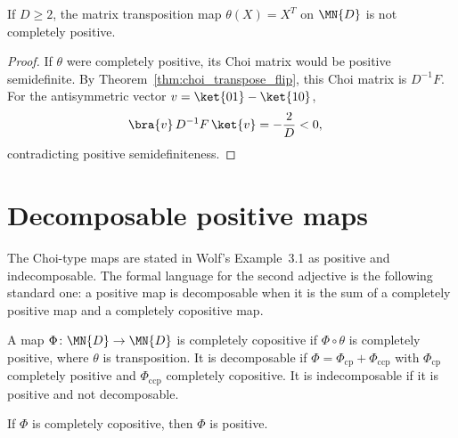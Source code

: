 \begin{theorem}
    \label{thm:transpose_not_completely_positive}
    \leanok
    If $D \ge 2$, the matrix transposition map $\theta(X)=X^T$ on $\MN{D}$
    is not completely positive.
\end{theorem}

\begin{proof}\leanok
    If $\theta$ were completely positive, its Choi matrix would be positive
    semidefinite. By Theorem~\ref{thm:choi_transpose_flip}, this Choi matrix is
    $D^{-1}F$. For the antisymmetric vector
    $v=\ket{01}-\ket{10}$,
    \begin{align}
        \bra{v}\,D^{-1}F\,\ket{v}
         & =-\frac{2}{D}<0,
        \notag
    \end{align}
    contradicting positive semidefiniteness.
\end{proof}

\section{Decomposable positive maps}

The Choi-type maps are stated in Wolf's Example~3.1 as positive and
indecomposable. The formal language for the second adjective is the following
standard one: a positive map is decomposable when it is the sum of a completely
positive map and a completely copositive map.

\begin{definition}
    \label{def:decomposable_positive_map}
    \leanok
    A map $\Phi\colon\MN{D}\to\MN{D}$ is completely copositive if
    $\Phi\circ\theta$ is completely positive, where $\theta$ is transposition.
    It is decomposable if
    $\Phi=\Phi_{\mathrm{cp}}+\Phi_{\mathrm{ccp}}$ with
    $\Phi_{\mathrm{cp}}$ completely positive and
    $\Phi_{\mathrm{ccp}}$ completely copositive. It is indecomposable if it is
    positive and not decomposable.
\end{definition}

\begin{lemma}
    \label{lem:completely_copositive_map_positive}
    \leanok
    If $\Phi$ is completely copositive, then $\Phi$ is positive.
\end{lemma}

